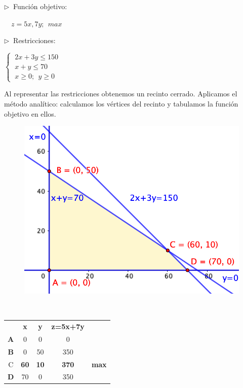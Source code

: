 \begin{multicols}{2}
$\triangleright \ $	Función objetivo: 

$\quad z=5x,7y;\ \ max$

$\triangleright \ $ Restricciones:

$\begin{cases} \ 2x+3y\le 150 \\ \ x+y\le 70 \\ \ x\ge 0;\ \ y\ge 0 \end{cases}$
\end{multicols}

\vspace{5mm} %
Al representar las restricciones obtenemos un recinto cerrado. Aplicamos el método analítico: calculamos los vértices del recinto y tabulamos la función objetivo en ellos.


\vspace{5mm}
\begin{multicols}{2}
	\begin{figure}[H] 	\centering
	\includegraphics[width=.45\textwidth]{imagenes/img45.png}
\end{figure}
$\,$
\begin{table}[H]
\centering
\begin{tabular}{cc|c|cc}
 & \textbf{x} & \textbf{y} & \textbf{z=5x+7y} & \textbf{} \\ \cline{2-4}
\multicolumn{1}{c|}{\textbf{A}} & 0 & 0 & \multicolumn{1}{c|}{0} &  \\ \cline{1-4}
\multicolumn{1}{c|}{\textbf{B}} & 0 & 50 & \multicolumn{1}{c|}{350} &  \\ \hline
\multicolumn{1}{c|}{C} & \textbf{60} & \textbf{10} & \multicolumn{1}{c|}{\textbf{370}} & \textbf{max} \\ \hline
\multicolumn{1}{c|}{\textbf{D}} & 70 & 0 & \multicolumn{1}{c|}{350} &  \\ \cline{2-4}
\end{tabular}
\end{table}
\end{multicols}

